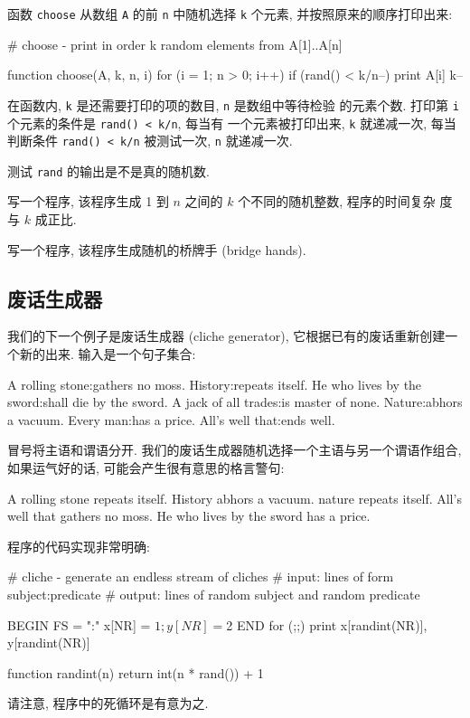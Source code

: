 函数 \texttt{choose} 从数组 \texttt{A} 的前 \texttt{n} 中随机选择
\texttt{k} 个元素, 并按照原来的顺序打印出来:
\begin{awkcode}
    # choose - print in order k random elements from A[1]..A[n]

    function choose(A, k, n,    i) {
        for (i = 1; n > 0; i++)
            if (rand() < k/n--) {
                print A[i]
                k--
            }
    }
\end{awkcode}
在函数内, \texttt{k} 是还需要打印的项的数目, \texttt{n} 是数组中等待检验
的元素个数. 打印第 \texttt{i} 个元素的条件是 \verb'rand() < k/n', 每当有
一个元素被打印出来, \texttt{k} 就递减一次, 每当判断条件 \verb'rand() < k/n'
被测试一次, \texttt{n} 就递减一次.

\begin{exercise}
    测试 \texttt{rand} 的输出是不是真的随机数.
\end{exercise}
\begin{exercise}
    写一个程序, 该程序生成 1 到 $n$ 之间的 $k$ 个不同的随机整数,
    程序的时间复杂 度与 $k$ 成正比.
\end{exercise}
\begin{exercise}
    写一个程序, 该程序生成随机的桥牌手 (bridge hands).
\end{exercise}

\subsection{废话生成器}
\label{subsec:cliche_generation}

我们的下一个例子是废话生成器 (cliche generator),
它根据已有的废话重新创建一个新的出来. 输入是一个句子集合:
\begin{file}
    A rolling stone:gathers no moss.
    History:repeats itself.
    He who lives by the sword:shall die by the sword.
    A jack of all trades:is master of none.
    Nature:abhors a vacuum.
    Every man:has a price.
    All's well that:ends well.
\end{file}
冒号将主语和谓语分开. 我们的废话生成器随机选择一个主语与另一个谓语作组合,
如果运气好的话, 可能会产生很有意思的格言警句:
\begin{file}
    A rolling stone repeats itself.
    History abhors a vacuum.
    nature repeats itself.
    All's well that gathers no moss.
    He who lives by the sword has a price.
\end{file}
程序的代码实现非常明确:
\begin{awkcode}
    # cliche - generate an endless stream of cliches
    #     input:  lines of form subject:predicate
    #     output: lines of random subject and random predicate

    BEGIN { FS = ":" }
          { x[NR] = $1; y[NR] = $2 }
    END   { for (;;) print x[randint(NR)], y[randint(NR)] }

    function randint(n) { return int(n * rand()) + 1 }
\end{awkcode}
请注意, 程序中的死循环是有意为之.

